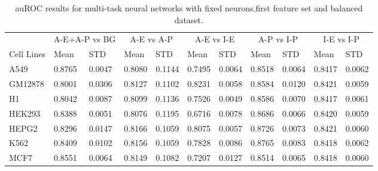 \begin{table}[!htbp]
\centering
\caption{auROC results for multi-task neural networks with fixed neurons,first feature set and balanced dataset.}
\label{tab:balanced_auroc}
\hspace*{-2.2cm}
\begin{tabular}[t]{*{11}{l}}
\toprule
 & \multicolumn{2}{c}{A-E+A-P vs BG} & \multicolumn{2}{c}{A-E vs A-P} & \multicolumn{2}{c}{A-E vs I-E} & \multicolumn{2}{c}{A-P vs I-P} & \multicolumn{2}{c}{I-E vs I-P} \\
\cmidrule(lr){2-3}
\cmidrule(lr){4-5}
\cmidrule(lr){6-7}
\cmidrule(lr){8-9}
\cmidrule(lr){10-11}
Cell Lines & Mean & STD & Mean & STD & Mean & STD & Mean & STD & Mean & STD \\
\midrule
A549  & 0.8765 & 0.0047 & 0.8080 & 0.1144 & 0.7495 & 0.0064 & 0.8518 & 0.0064 & 0.8417 & 0.0062\\
GM12878  & 0.8001 & 0.0306 & 0.8127 & 0.1102 & 0.8231 & 0.0058 & 0.8584 & 0.0120 & 0.8421 & 0.0059\\
H1  & 0.8042 & 0.0087 & 0.8099 & 0.1136 & 0.7526 & 0.0049 & 0.8586 & 0.0070 & 0.8417 & 0.0061\\
HEK293  & 0.8388 & 0.0051 & 0.8076 & 0.1195 & 0.6716 & 0.0078 & 0.8686 & 0.0066 & 0.8420 & 0.0059\\
HEPG2  & 0.8296 & 0.0147 & 0.8166 & 0.1059 & 0.8075 & 0.0057 & 0.8726 & 0.0073 & 0.8421 & 0.0060\\
K562  & 0.8409 & 0.0102 & 0.8156 & 0.1059 & 0.7828 & 0.0086 & 0.8765 & 0.0083 & 0.8418 & 0.0062\\
MCF7  & 0.8551 & 0.0064 & 0.8149 & 0.1082 & 0.7207 & 0.0127 & 0.8514 & 0.0065 & 0.8418 & 0.0060\\
\bottomrule
\end{tabular}
\hspace*{-2.2cm}
\end{table}
